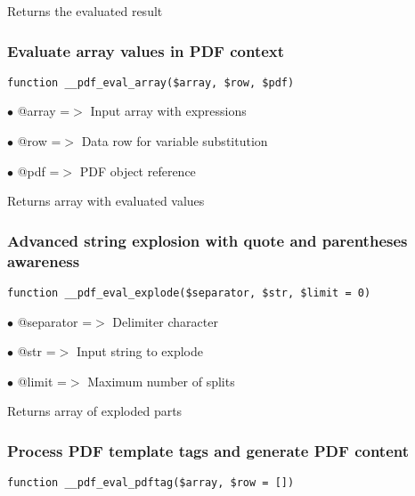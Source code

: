 \documentclass[a4paper]{article}
\begin{document}
Returns the evaluated result

\hypertarget{toc511}{}
\subsubsection{Evaluate array values in PDF context}

\begin{lstlisting}
function __pdf_eval_array($array, $row, $pdf)
\end{lstlisting}

\begin{compactitem}
\item[\color{myblue}$\bullet$] @array =$>$ Input array with expressions
\item[\color{myblue}$\bullet$] @row   =$>$ Data row for variable substitution
\item[\color{myblue}$\bullet$] @pdf   =$>$ PDF object reference
\end{compactitem}

Returns array with evaluated values

\hypertarget{toc512}{}
\subsubsection{Advanced string explosion with quote and parentheses awareness}

\begin{lstlisting}
function __pdf_eval_explode($separator, $str, $limit = 0)
\end{lstlisting}

\begin{compactitem}
\item[\color{myblue}$\bullet$] @separator =$>$ Delimiter character
\item[\color{myblue}$\bullet$] @str       =$>$ Input string to explode
\item[\color{myblue}$\bullet$] @limit     =$>$ Maximum number of splits
\end{compactitem}

Returns array of exploded parts

\hypertarget{toc513}{}
\subsubsection{Process PDF template tags and generate PDF content}

\begin{lstlisting}
function __pdf_eval_pdftag($array, $row = [])
\end{lstlisting}
\end{document}
